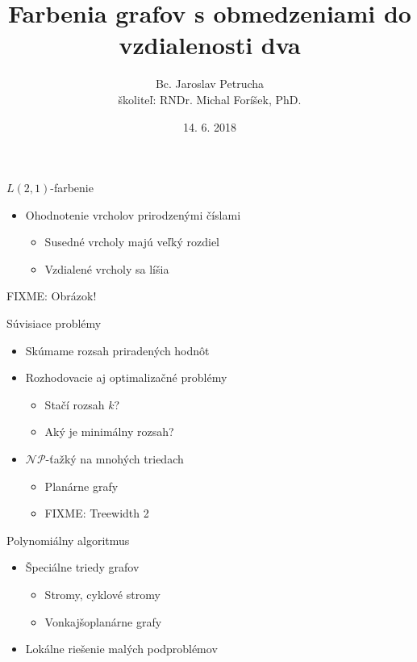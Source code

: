 \documentclass{beamer}
\title[$L(2,1)$-farbenia grafov]{Farbenia grafov s obmedzeniami do vzdialenosti dva}
\author{Bc. Jaroslav Petrucha \\ školiteľ: RNDr. Michal Foríšek, PhD.}
\date{14. 6. 2018}
\begin{document}
\begin{frame}
\titlepage
\end{frame}

\begin{frame}{$L(2,1)$-farbenie}
    \begin{itemize}
        \item Ohodnotenie vrcholov prirodzenými číslami
        \begin{itemize}
            \item Susedné vrcholy majú veľký rozdiel
            \item Vzdialené vrcholy sa líšia
        \end{itemize}
    \end{itemize}
        FIXME: Obrázok!
\end{frame}

\begin{frame}{Súvisiace problémy}
    \begin{itemize}
        \item Skúmame rozsah priradených hodnôt
        \item Rozhodovacie aj optimalizačné problémy
        \begin{itemize}
            \item Stačí rozsah $k$?
            \item Aký je minimálny rozsah?
        \end{itemize}
        \item{$\mathcal{NP}$-ťažký na mnohých triedach}
        \begin{itemize}
            \item Planárne grafy
            \item FIXME: Treewidth 2
        \end{itemize}
    \end{itemize}
\end{frame}

\begin{frame}{Polynomiálny algoritmus}
    \begin{itemize}
        \item Špeciálne triedy grafov
        \begin{itemize}
            \item Stromy, cyklové stromy
            \item Vonkajšoplanárne grafy
        \end{itemize}
        \item Lokálne riešenie malých podproblémov
    \end{itemize}
\end{frame}
\end{document}
